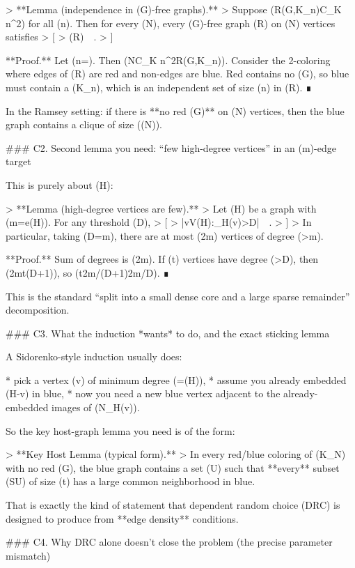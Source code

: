 > **Lemma (independence in (G)-free graphs).**
> Suppose (R(G,K_n)\le C_K n^2) for all (n). Then for every (N), every (G)-free graph (R) on (N) vertices satisfies
> [
> \alpha(R)\ \ge\ \left\lfloor {}\right\rfloor.
> ]

**Proof.** Let (n=\lfloor {}\rfloor). Then (N\ge C_K n^2\ge R(G,K_n)). Consider the 2-coloring where edges of (R) are red and non-edges are blue. Red contains no (G), so blue must contain a (K_n), which is an independent set of size (n) in (R). ∎

In the Ramsey setting: if there is **no red (G)** on (N) vertices, then the blue graph contains a clique of size (\Omega(\sqrt N)).

### C2. Second lemma you need: “few high-degree vertices” in an (m)-edge target

This is purely about (H):

> **Lemma (high-degree vertices are few).**
> Let (H) be a graph with (m=e(H)). For any threshold (D),
> [
> |{v\in V(H):\deg_H(v)>D}|\ \le\ .
> ]
> In particular, taking (D=\lceil \sqrt m\rceil), there are at most (2\sqrt m) vertices of degree (>\sqrt m).

**Proof.** Sum of degrees is (2m). If (t) vertices have degree (>D), then (2m\ge t(D+1)), so (t\le 2m/(D+1)\le 2m/D). ∎

This is the standard “split into a small dense core and a large sparse remainder” decomposition.

### C3. What the induction *wants* to do, and the exact sticking lemma

A Sidorenko-style induction usually does:

* pick a vertex (v) of minimum degree (\delta=\delta(H)),
* assume you already embedded (H-v) in blue,
* now you need a new blue vertex adjacent to the already-embedded images of (N_H(v)).

So the key host-graph lemma you need is of the form:

> **Key Host Lemma (typical form).**
> In every red/blue coloring of (K_N) with no red (G), the blue graph contains a set (U) such that **every** subset (S\subseteq U) of size (\le t) has a large common neighborhood in blue.

That is exactly the kind of statement that dependent random choice (DRC) is designed to produce from **edge density** conditions.

### C4. Why DRC alone doesn’t close the problem (the precise parameter mismatch)

